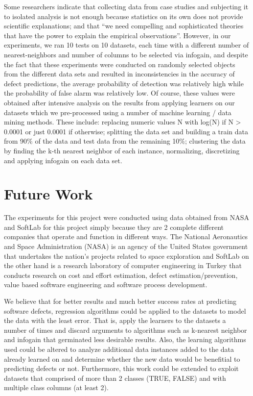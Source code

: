 \documentclass{sig-alternate}
\begin{document}
Some researchers indicate that collecting data from case studies and subjecting it to isolated analysis is not enough because statistics on its own does not provide scientific explanations; and that ``we need compelling and sophisticated theories that have the power to explain the empirical observations''\cite{critique}. However, in our experiments, we ran 10 tests on 10 datasets, each time with a different number of nearest-neighbors and number of columns to be selected via infogain, and despite the fact that these experiments were conducted on randomly selected objects from the different data sets and resulted in inconsistencies in the accuracy of defect predictions, the average probability of detection was relatively high while the probability of false alarm was relatively low. Of course, these values were obtained after intensive analysis on the results from applying learners on our datasets which we pre-processed using a number of machine learning / data mining methods. These include: replacing numeric values N with log(N) if N > 0.0001 or just 0.0001 if otherwise; splitting the data set and building a train data from 90\% of the data and test data from the remaining 10\%; clustering the data by finding the k-th nearest neighbor of each instance, normalizing, discretizing and applying infogain on each data set.


\section{Future Work}
The experiments for this project were conducted using data obtained from NASA and SoftLab for this project simply because they are 2 complete different companies that operate and function in different ways. 
The National Aeronautics and Space Administration (NASA) is an agency of the United States government that undertakes the nation's projects related to space exploration and SoftLab on the other hand is a research laboratory of computer engineering in Turkey that conducts research on cost and effort estimation, defect estimation/prevention, value based software engineering and software process development. 

We believe that for better results and much better success rates at predicting software defects, regression algorithms could be applied to the datasets to model the data with the least error. That is, apply the learners to the datasets a number of times and discard arguments to algorithms such as k-nearest neighbor and infogain that germinated less desirable results. Also, the learning algorithms used could be altered to analyze additional data instances added to the data already learned on and determine whether the new data would be benefitial to predicting defects or not.
Furthermore, this work could be extended to exploit datasets that comprised of more than 2 classes (TRUE, FALSE) and with multiple class columns (at least 2).
\end{document}
